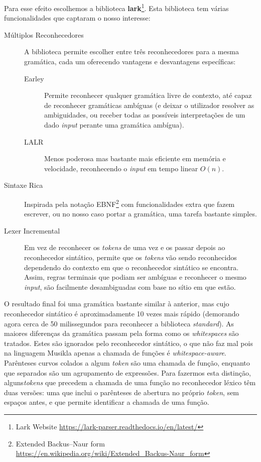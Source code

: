 Para esse efeito escolhemos a biblioteca \textbf{lark}\footnote{Lark Website \url{https://lark-parser.readthedocs.io/en/latest/}}. Esta biblioteca tem várias funcionalidades que captaram o nosso interesse:
\begin{description}
 \item[Múltiplos Reconhecedores] A biblioteca permite escolher entre três reconhecedores para a mesma gramática, cada um oferecendo vantagens e desvantagens específicas:
    \begin{description}
     \item[Earley] Permite reconhecer qualquer gramática livre de contexto, até capaz de reconhecer gramáticas ambíguas (e deixar o utilizador resolver as ambiguidades, ou receber todas as possíveis interpretações de um dado \textit{input} perante uma gramática ambígua).
     \item[LALR] Menos poderosa mas bastante mais eficiente em memória e velocidade, reconhecendo o \textit{input} em tempo linear $O(n)$.
    \end{description}
 \item[Sintaxe Rica] Inspirada pela notação EBNF\footnote{Extended Backus–Naur form \url{https://en.wikipedia.org/wiki/Extended\_Backus-Naur\_form}} com funcionalidades extra que fazem escrever, ou no nosso caso portar a gramática, uma tarefa bastante simples. 
 \item[Lexer Incremental] Em vez de reconhecer os \textit{tokens} de uma vez e os passar depois ao reconhecedor sintático, permite que os \textit{tokens} vão sendo reconhecidos dependendo do contexto em que o reconhecedor sintático se encontra. Assim, regras terminais que podiam ser ambíguas e reconhecer o mesmo \textit{input}, são facilmente desambiguadas com base no sítio em que estão.
\end{description}

O resultado final foi uma gramática bastante similar à anterior, mas cujo reconhecedor sintático é aproximadamente 10 vezes mais rápido (demorando agora cerca de 50 milissegundos para reconhecer a biblioteca \textit{standard}). As maiores diferenças da gramática passam pela forma como os \textit{whitespaces} são tratados. Estes são ignorados pelo reconhecedor sintático, o que não faz mal pois na linguagem Musikla apenas a chamada de funções é \textit{whitespace-aware}. Parênteses curvos colados a algum \textit{token} são uma chamada de função, enquanto que separados são um agrupamento de expressões. Para fazermos esta distinção, alguns\textit{tokens} que precedem a chamada de uma função no reconhecedor léxico têm duas versões: uma que inclui o parênteses de abertura no próprio \textit{token}, sem espaços antes, e que permite identificar a chamada de uma função.

